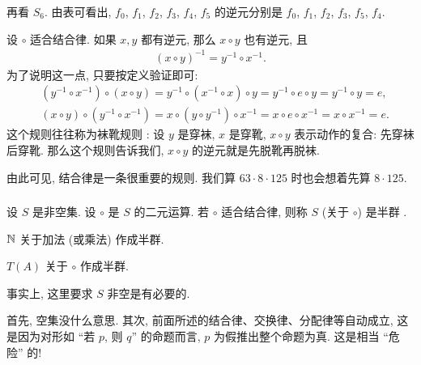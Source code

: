 \begin{example}
    再看 $S_6$. 由表可看出, $f_0$, $f_1$, $f_2$, $f_3$, $f_4$, $f_5$ 的逆元分别是 $f_0$, $f_1$, $f_2$, $f_3$, $f_5$, $f_4$.
\end{example}

\begin{remark}
    设 $\circ$ 适合结合律. 如果 $x,y$ 都有逆元, 那么 $x \circ y$ 也有逆元, 且
    \begin{align*}
        (x \circ y)^{-1} = y^{-1} \circ x^{-1}.
    \end{align*}
    为了说明这一点, 只要按定义验证即可:
    \begin{align*}
         & (y^{-1} \circ x^{-1}) \circ (x \circ y) = y^{-1} \circ (x^{-1} \circ x) \circ y = y^{-1} \circ e \circ y = y^{-1} \circ y = e, \\
         & (x \circ y) \circ (y^{-1} \circ x^{-1}) = x \circ (y \circ y^{-1}) \circ x^{-1} = x \circ e \circ x^{-1} = x \circ x^{-1} = e.
    \end{align*}
    这个规则往往称为袜靴规则 : 设 $y$ 是穿袜, $x$ 是穿靴, $x \circ y$ 表示动作的复合: 先穿袜后穿靴. 那么这个规则告诉我们, $x \circ y$ 的逆元就是先脱靴再脱袜.
\end{remark}

\begin{remark}
    由此可见, 结合律是一条很重要的规则. 我们算 $63 \cdot 8 \cdot 125$ 时也会想着先算 $8 \cdot 125$.
\end{remark}

\subsubsection*{\SemiGroupsAndGroups}

\begin{definition}
    设 $S$ 是非空集. 设 $\circ$ 是 $S$ 的二元运算. 若 $\circ$ 适合结合律, 则称 $S$ (关于 $\circ$) 是半群 .
\end{definition}

\begin{example}
    $\mathbb{N}$ 关于加法 (或乘法) 作成半群.
\end{example}

\begin{example}
    $T(A)$ 关于 $\circ$ 作成半群.
\end{example}

\begin{remark}
    事实上, 这里要求 $S$ 非空是有必要的.

    首先, 空集没什么意思. 其次, 前面所述的结合律、交换律、分配律等自动成立, 这是因为对形如 ``若 $p$, 则 $q$'' 的命题而言, $p$ 为假推出整个命题为真. 这是相当 ``危险'' 的!
\end{remark}

